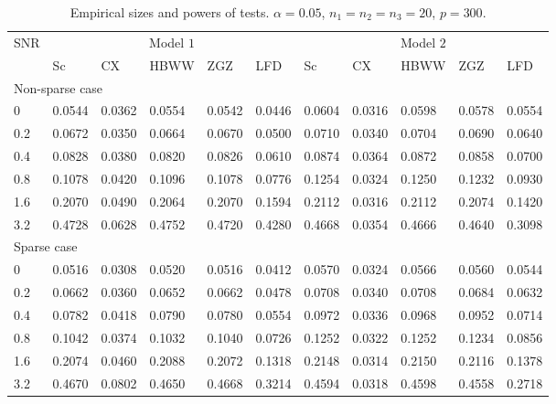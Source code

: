 \documentclass[12pt]{article} %
\theoremstyle{definition}
\begin{document}
\begin{table}[!hbp]
    \caption{Empirical sizes and powers of tests. $\alpha=0.05$, $n_1=n_2=n_3=20$, $p=300$. }
    \label{table1}
    \centering
    \begin{tabular}{*{11}{l}}
    \toprule
    \multirow{2}{*}{SNR} &\multicolumn{5}{c}{Model $1$}&
    \multicolumn{5}{c}{Model $2$} \\
        \cmidrule(r){2-6}\cmidrule(r){7-11}
& Sc & CX & HBWW & ZGZ & LFD & Sc & CX & HBWW & ZGZ & LFD \\ 
    \midrule
    \multicolumn{5}{l}{Non-sparse case}
    \\
    \midrule
0 & 0.0544 & 0.0362 & 0.0554 & 0.0542 & 0.0446 & 0.0604 & 0.0316 & 0.0598 & 0.0578 & 0.0554 \\ 
  0.2 & 0.0672 & 0.0350 & 0.0664 & 0.0670 & 0.0500 & 0.0710 & 0.0340 & 0.0704 & 0.0690 & 0.0640 \\ 
  0.4 & 0.0828 & 0.0380 & 0.0820 & 0.0826 & 0.0610 & 0.0874 & 0.0364 & 0.0872 & 0.0858 & 0.0700 \\ 
  0.8 & 0.1078 & 0.0420 & 0.1096 & 0.1078 & 0.0776 & 0.1254 & 0.0324 & 0.1250 & 0.1232 & 0.0930 \\ 
  1.6 & 0.2070 & 0.0490 & 0.2064 & 0.2070 & 0.1594 & 0.2112 & 0.0316 & 0.2112 & 0.2074 & 0.1420 \\ 
  3.2 & 0.4728 & 0.0628 & 0.4752 & 0.4720 & 0.4280 & 0.4668 & 0.0354 & 0.4666 & 0.4640 & 0.3098 \\ 

    \midrule
    \multicolumn{5}{l}{Sparse case}
    \\
    \midrule

  0 & 0.0516 & 0.0308 & 0.0520 & 0.0516 & 0.0412 & 0.0570 & 0.0324 & 0.0566 & 0.0560 & 0.0544 \\ 
  0.2 & 0.0662 & 0.0360 & 0.0652 & 0.0662 & 0.0478 & 0.0708 & 0.0340 & 0.0708 & 0.0684 & 0.0632 \\ 
  0.4 & 0.0782 & 0.0418 & 0.0790 & 0.0780 & 0.0554 & 0.0972 & 0.0336 & 0.0968 & 0.0952 & 0.0714 \\ 
  0.8 & 0.1042 & 0.0374 & 0.1032 & 0.1040 & 0.0726 & 0.1252 & 0.0322 & 0.1252 & 0.1234 & 0.0856 \\ 
  1.6 & 0.2074 & 0.0460 & 0.2088 & 0.2072 & 0.1318 & 0.2148 & 0.0314 & 0.2150 & 0.2116 & 0.1378 \\ 
  3.2 & 0.4670 & 0.0802 & 0.4650 & 0.4668 & 0.3214 & 0.4594 & 0.0318 & 0.4598 & 0.4558 & 0.2718 \\ 



\bottomrule
\end{tabular}
\end{table}
\end{document}
